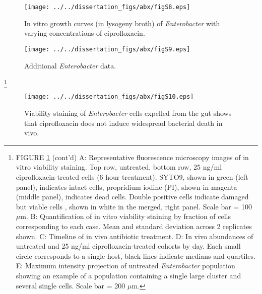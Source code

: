 {{{{\begin{figure}[H]
	\centerline{
		\texttt{[image: ../../dissertation\_figs/abx/figS8.eps]}} 
	\caption{In vitro growth curves (in lysogeny broth) of \textit{Enterobacter} with varying concentrations of ciprofloxacin.}
\end{figure}


\begin{figure}[H]
	\centerline{
		\texttt{[image: ../../dissertation\_figs/abx/figS9.eps]}}
	\caption{Additional \textit{Enterobacter} data.}
	\label{fig:figS9}
\end{figure}

{\let\thefootnote\relax\footnote{FIGURE \ref{fig:figS9} (cont'd) A: Representative fluorescence microscopy images of in vitro viability staining. Top row, untreated, bottom row, 25 ng/ml ciprofloxacin-treated cells (6 hour treatment). SYTO9, shown in green (left panel), indicates intact cells, propridium iodine (PI), shown in magenta (middle panel), indicates dead cells. Double positive cells indicate damaged but viable cells \cite{ben2005genetic}, shown in white in the merged, right panel. Scale bar = 100 $\mu$m. B: Quantification of in vitro viability staining by fraction of cells corresponding to each case. Mean and standard deviation across 2 replicates shown. C: Timeline of in vivo antibiotic treatment. D: In vivo abundances of untreated and 25 ng/ml ciprofloxacin-treated cohorts by day. Each small circle corresponds to a single host, black lines indicate medians and quartiles. E: Maximum intensity projection of untreated \textit{Enterobacter} population showing an example of a population containing a single large cluster and several single cells. Scale bar = 200 $\mu$m.}


\begin{figure}[H]
	\centerline{
		\texttt{[image: ../../dissertation\_figs/abx/figS10.eps]}} 
	\caption{Viability staining of \textit{Enterobacter} cells expelled from the gut shows that ciprofloxacin does not induce widespread bacterial death in vivo.}
	\label{fig:figS10}
\end{figure}

}}}}}
